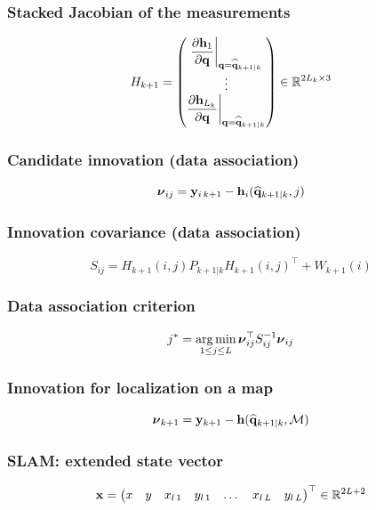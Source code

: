 \subsubsection{Stacked Jacobian of the measurements}
\begin{equation*}
    H_{k+1}=\begin{pmatrix}\dfrac{\partial\mathbf h_1}{\partial{\mathbf q}}\bigg|_{{\mathbf q}=\widehat{{\mathbf q}}_{k+1|k}}\\\vdots\\\dfrac{\partial\mathbf h_{L_k}}{\partial{\mathbf q}}\bigg|_{{\mathbf q}=\widehat{{\mathbf q}}_{k+1|k}}\end{pmatrix}\in{\mathbb R}^{2L_k\times3}
\end{equation*}

\subsubsection{Candidate innovation (data association)}
\begin{equation*}
    {\boldsymbol{\nu}}_{ij}=\mathbf y_{i\,k+1}-\mathbf h_i(\widehat{{\mathbf q}}_{k+1|k},j)
\end{equation*}

\subsubsection{Innovation covariance (data association)}
\begin{equation*}
    S_{ij}=H_{k+1}(i,j)P_{k+1|k}H_{k+1}(i,j)^\top+W_{k+1}(i)
\end{equation*}

\subsubsection{Data association criterion}
\begin{equation*}
    j^*=\operatorname*{arg\,min}_{1\le j\le L}{\boldsymbol{\nu}}_{ij}^\top S_{ij}^{-1}{\boldsymbol{\nu}}_{ij}
\end{equation*}

\subsubsection{Innovation for localization on a map}
\begin{equation*}
    {\boldsymbol{\nu}}_{k+1}=\mathbf y_{k+1}-\mathbf h(\widehat{{\mathbf q}}_{k+1|k},\mathcal M)
\end{equation*}

\subsubsection{SLAM: extended state vector}
\begin{equation*}
    \mathbf x=\begin{pmatrix}x&y&x_{l\,1}&y_{l\,1}&\dots&x_{l\,L}&y_{l\,L}\end{pmatrix}^\top\in{\mathbb R}^{2L+2}
\end{equation*}

